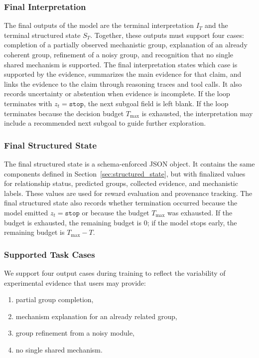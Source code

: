 \documentclass[thesis,letterpaper,12pt]{utthesis}
\begin{document}
\subsubsection{Final Interpretation}
The final outputs of the model are the terminal interpretation $I_T$ and the terminal structured state $S_T$. Together, these outputs must support four cases: completion of a partially observed mechanistic group, explanation of an already coherent group, refinement of a noisy group, and recognition that no single shared mechanism is supported. The final interpretation states which case is supported by the evidence, summarizes the main evidence for that claim, and links the evidence to the claim through reasoning traces and tool calls. It also records uncertainty or abstention when evidence is incomplete. If the loop terminates with $z_t = \texttt{stop}$, the next subgoal field is left blank. If the loop terminates because the decision budget $T_{\max}$ is exhausted, the interpretation may include a recommended next subgoal to guide further exploration.

\subsubsection{Final Structured State}
The final structured state is a schema-enforced JSON object. It contains the same components defined in Section~\ref{sec:structured_state}, but with finalized values for relationship status, predicted groups, collected evidence, and mechanistic labels. These values are used for reward evaluation and provenance tracking. The final structured state also records whether termination occurred because the model emitted $z_t = \texttt{stop}$ or because the budget $T_{\max}$ was exhausted. If the budget is exhausted, the remaining budget is $0$; if the model stops early, the remaining budget is $T_{\max} - T$.

\subsubsection{Supported Task Cases}
We support four output cases during training to reflect the variability of experimental evidence that users may provide:
\begin{enumerate}
    \item partial group completion,
    \item mechanism explanation for an already related group,
    \item group refinement from a noisy module,
    \item no single shared mechanism.
\end{enumerate}
\end{document}
